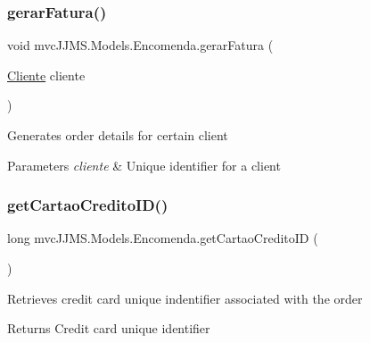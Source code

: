 \subsubsection{\texorpdfstring{gerar\+Fatura()}{gerarFatura()}}
{\footnotesize\ttfamily void mvc\+J\+J\+M\+S.\+Models.\+Encomenda.\+gerar\+Fatura (\begin{DoxyParamCaption}\item[{\mbox{\hyperlink{classmvc_j_j_m_s_1_1_models_1_1_cliente}{Cliente}}}]{cliente }\end{DoxyParamCaption})\hspace{0.3cm}{\ttfamily [inline]}}



Generates order details for certain client 


\begin{DoxyParams}{Parameters}
{\em cliente} & Unique identifier for a client\\
\hline
\end{DoxyParams}
\mbox{\label{classmvc_j_j_m_s_1_1_models_1_1_encomenda_a8d320ae133bda1cc87a7d8d5fe616c52}} 
\subsubsection{\texorpdfstring{get\+Cartao\+Credito\+I\+D()}{getCartaoCreditoID()}}
{\footnotesize\ttfamily long mvc\+J\+J\+M\+S.\+Models.\+Encomenda.\+get\+Cartao\+Credito\+ID (\begin{DoxyParamCaption}{ }\end{DoxyParamCaption})\hspace{0.3cm}{\ttfamily [inline]}}



Retrieves credit card unique indentifier associated with the order 

\begin{DoxyReturn}{Returns}
Credit card unique identifier
\end{DoxyReturn}
\mbox{\label{classmvc_j_j_m_s_1_1_models_1_1_encomenda_a2e776d2ce3ef684e288f83bf688d0dab}} 
